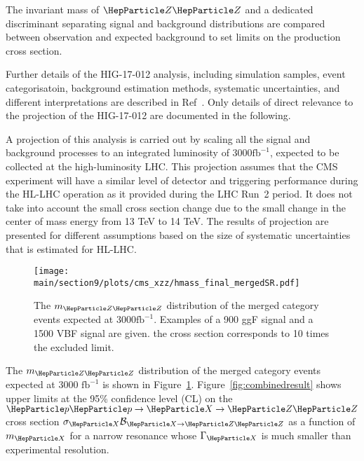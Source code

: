 The invariant mass of $\PZ \PZ$ and a dedicated discriminant separating signal and background distributions are compared between observation and expected background to set limits on the production cross section. 

Further details of the HIG-17-012 analysis, including simulation samples, event categorisatoin, background estimation methods, systematic uncertainties, and different interpretations are described in Ref~\cite{Sirunyan:2018qlb}. Only details of direct relevance to the projection of the HIG-17-012 are documented in the following.


A projection of this analysis is carried out by scaling all the signal
and background processes to an integrated luminosity of 3000$\mathrm{fb}^{-1}$, expected to be collected at the high-luminosity LHC. This projection assumes that the CMS experiment will have a similar level of detector and triggering performance during the HL-LHC operation as it provided during the LHC Run~2 period. It does not take into account the small cross section change due to the small change in the center of mass energy from 13 TeV to 14 TeV. The results of projection are presented for different assumptions based on the size of systematic uncertainties that is estimated for HL-LHC. %

\begin{figure}[htbp]
        \centering
                \texttt{[image: \\main/section9/plots/cms\_xzz/hmass\_final\_mergedSR.pdf]}
                \caption{The $m_{\PZ\PZ}$ distribution of the merged category events expected at 3000$\mathrm{fb}^{-1}$. Examples of a 900 \UGeV ggF signal and a 1500 \UGeV VBF signal are given. the cross section corresponds to 10 times the excluded limit. 
        \label{fig:mzz}
        }
            \end{figure}
The $m_{\PZ\PZ}$ distribution of the merged category events expected at 3000 $\mathrm{fb}^{-1}$ is shown in Figure~\ref{fig:mzz}. Figure~\ref{fig:combinedresult} shows upper limits at the 95\% confidence level (CL) on the $\Pp\Pp\to\PX\to\PZ\PZ$ cross section
$\sigma_{\PX} \mathcal{B}_{{\PX}\to\PZ\PZ}$ as a function of $m_{\PX}$ for a narrow resonance whose $\Gamma_{\PX}$ is much smaller than experimental resolution.

